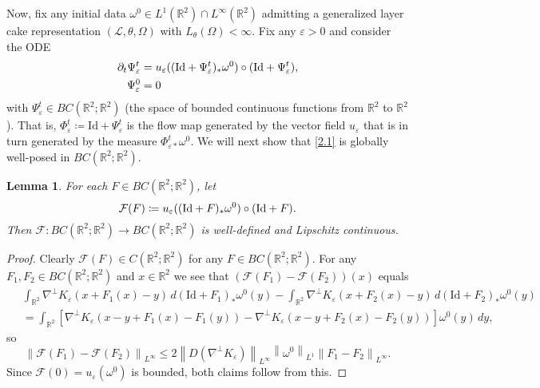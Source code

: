 \documentclass[reqno,centertags,12pt]{amsart}
\newtheorem{lemma}[theorem]{Lemma}
\theoremstyle{definition}
\numberwithin{equation}{section}
\newcommand{\norm}[1]{\left\|#1\right\|}
\newcommand{\bbR}{{\mathbb{R}}}
\newcommand{\eps}{\varepsilon}
\newcommand{\tht}{\theta}
\begin{document}
Now, fix any initial data $\omega^{0}\in L^{1}(\bbR^{2})\cap L^{\infty}(\bbR^{2})$
admitting a generalized layer cake representation
$(\mathcal{L},\theta,\Omega)$ with $L_{\tht}(\Omega) < \infty$.
Fix any $\eps>0$ and consider the ODE
\begin{equation}\label{2.1}
        \begin{aligned}
            \partial_{t}\Psi_{\eps}^{t}
            &= u_{\eps}((\mathrm{Id} + \Psi_{\eps}^{t})_{*}\omega^{0}) \circ ({\rm Id} + \Psi_{\eps}^{t}), \\
            \Psi_{\eps}^{0} &= 0
        \end{aligned}
\end{equation}
with $\Psi_\eps^t \in BC(\bbR^{2};\bbR^{2})$ (the space of bounded continuous functions from $\bbR^{2}$ to $\bbR^{2}$).
That is, $\Phi_{\eps}^{t}\coloneqq \mathrm{Id} + \Psi_{\eps}^{t}$
is the flow map generated by the vector field
$u_{\eps}$ that is in turn generated by the measure $\Phi_{\eps *}^{t}\omega^{0}$. We will next show that \eqref{2.1} is globally well-posed in $BC(\bbR^{2};\bbR^{2})$.

\begin{lemma}\label{L2.4}
    For each $F\in BC(\bbR^{2};\bbR^{2})$, let
    \[
        \mathcal{F}(F) \coloneqq u_{\eps}((\mathrm{Id} + F)_{*}\omega^{0})\circ ({\rm Id} + F).
    \]
    Then $\mathcal{F}\colon    BC(\bbR^{2};\bbR^{2})\to BC(\bbR^{2};\bbR^{2})$
    is well-defined and  Lipschitz continuous.
\end{lemma}

\begin{proof}
    Clearly $\mathcal{F}(F)\in C(\bbR^{2}; \bbR^{2})$
    for any $F\in BC(\bbR^{2};\bbR^{2})$.
    For any $F_{1},F_{2}\in BC(\bbR^{2};\bbR^{2})$ and $x\in\bbR^{2}$ we see that $(\mathcal{F}(F_{1}) - \mathcal{F}(F_{2}))(x)$ equals
    \begin{equation*}
        \begin{aligned}
&\             \int_{\bbR^{2}} \nabla^{\perp}K_{\eps}(x + F_{1}(x) - y)
            \,d(\mathrm{Id} + F_{1})_{*}\omega^{0}(y)
            - \int_{\bbR^{2}} \nabla^{\perp}K_{\eps}(x + F_{2}(x) - y)
            \,d(\mathrm{Id} + F_{2})_{*}\omega^{0}(y)
            \\&\ 
            = \int_{\bbR^{2}}
            \left[
                \nabla^{\perp}K_{\eps}(x - y + F_{1}(x) - F_{1}(y))
                - \nabla^{\perp}K_{\eps}(x - y + F_{2}(x) - F_{2}(y))
            \right]
            \omega^{0}(y)\,dy,
        \end{aligned}
    \end{equation*}
    so
    \[
        \norm{\mathcal{F}(F_{1}) - \mathcal{F}(F_{2})}_{L^{\infty}}
        \leq 2\norm{D(\nabla^{\perp}K_{\eps})}_{L^{\infty}}\norm{\omega^{0}}_{L^{1}}
        \norm{F_{1} - F_{2}}_{L^{\infty}}.
    \]
    Since $\mathcal{F}(0) = u_{\eps}(\omega^{0})$ is bounded,
    both claims follow from this.
\end{proof}
\end{document}
